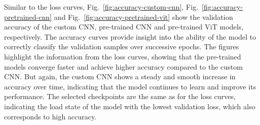 Similar to the loss curves, Fig.~\ref{fig:accuracy-custom-cnn}, Fig.~\ref{fig:accuracy-pretrained-cnn} and Fig.~\ref{fig:accuracy-pretrained-vit} show the validation accuracy of the custom CNN, pre-trained CNN and pre-trained ViT models, respectively. The accuracy curves provide insight into the ability of the model to correctly classify the validation samples over successive epochs. The figures highlight the information from the loss curves, showing that the pre-trained models converge faster and achieve higher accuracy compared to the custom CNN. But again, the custom CNN shows a steady and smooth increase in accuracy over time, indicating that the model continues to learn and improve its performance. The selected checkpoints are the same as for the loss curves, indicating the load state of the model with the lowest validation loss, which also corresponds to high accuracy.